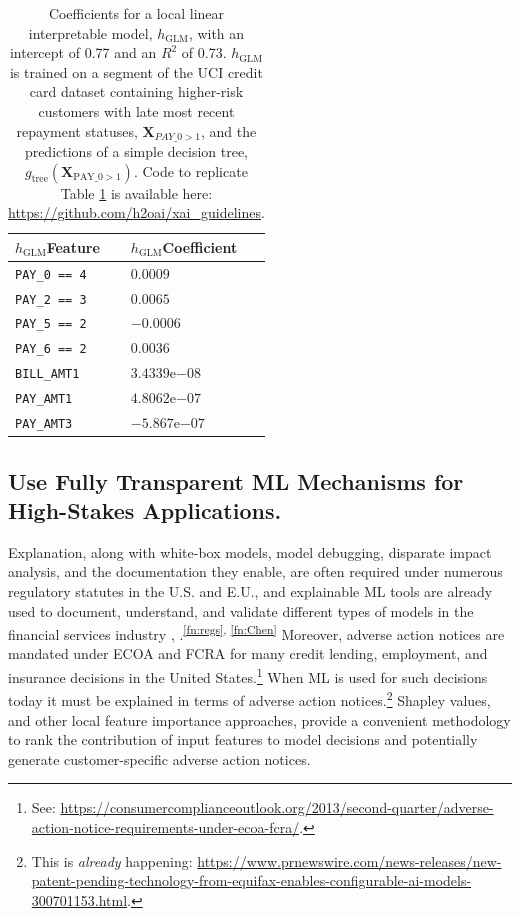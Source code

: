 \documentclass[sigconf]{acmart}
\begin{document}
\begin{table}[htb!]
	\caption{Coefficients for a local linear interpretable model, $h_{\text{GLM}}$, with an intercept of 0.77 and an $R^2$ of 0.73. $h_{\text{GLM}}$ is trained on a segment of the UCI credit card dataset containing higher-risk customers with late most recent repayment statuses, $\mathbf{X}_{PAY \_ 0 > 1}$, and the predictions of a simple decision tree, $g_{\text{tree}}(\mathbf{X}_{\text{PAY\_0} > 1})$. Code to replicate Table \ref{tab:lime} is available here: \url{https://github.com/h2oai/xai_guidelines}.} 
		\centering
			\footnotesize
				\begin{tabular}{ | p{2cm} | p{1.7cm} | }
				\hline
				$h_{\text{GLM}}$\newline Feature & $h_{\text{GLM}}$\newline Coefficient \\ 
				\hline
				\texttt{PAY\_0 == 4} & $0.0009$ \\
				\hline
				\texttt{PAY\_2 == 3} & $0.0065$ \\
				\hline
				\texttt{PAY\_5 == 2} & $-0.0006$ \\
				\hline
				\texttt{PAY\_6 == 2} & $0.0036$ \\
				\hline				
				\texttt{BILL\_AMT1} & $3.4339\mathrm{e}{-08}$ \\
				\hline
				\texttt{PAY\_AMT1} & $4.8062\mathrm{e}{-07}$ \\
				\hline	
				\texttt{PAY\_AMT3} & $-5.867\mathrm{e}{-07}$ \\	
				\hline	
			\end{tabular}	
  		\label{tab:lime}
\end{table}	

\subsection{Use Fully Transparent ML Mechanisms for High-Stakes Applications.} \label{sec:white_box}

Explanation, along with white-box models, model debugging, disparate impact analysis, and the documentation they enable, are often required under numerous regulatory statutes in the U.S. and E.U., and explainable ML tools are already used to document, understand, and validate different types of models in the financial services industry \cite{lime-sup}, \cite{wf_xnn}.\textsuperscript{\ref{fn:regs}, \ref{fn:Chen}} Moreover, adverse action notices are mandated under ECOA and FCRA for many credit lending, employment, and insurance decisions in the United States.\footnote{\scriptsize{See: \url{https://consumercomplianceoutlook.org/2013/second-quarter/adverse-action-notice-requirements-under-ecoa-fcra/}.}} When ML is used for such decisions today it must be explained in terms of adverse action notices.\footnote{\scriptsize{This is \textit{already} happening: \url{https://www.prnewswire.com/news-releases/new-patent-pending-technology-from-equifax-enables-configurable-ai-models-300701153.html}.}} Shapley values, and other local feature importance approaches, provide a convenient methodology to rank the contribution of input features to model decisions and potentially generate customer-specific adverse action notices. 
\end{document}
